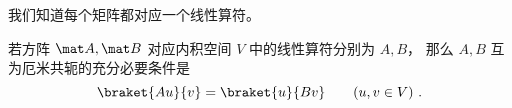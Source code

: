 
\begin{issues}
\issueDraft
\end{issues}


我们知道每个矩阵都对应一个线性算符。

\begin{theorem}{}
若方阵 $\mat A, \mat B$ 对应内积空间 $V$ 中的线性算符分别为 $A, B$， 那么 $A, B$ 互为厄米共轭的充分必要条件是
\begin{equation}
\braket{Au}{v} = \braket{u}{B v} \qquad (u, v \in V)~.
\end{equation}
\end{theorem}

